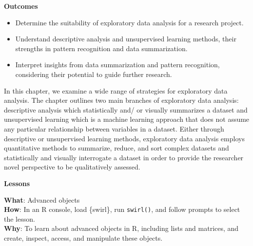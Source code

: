 \documentclass[
  letterpaper,
]{book}
\providecommand{\tightlist}{%
  \setlength{\itemsep}{0pt}\setlength{\parskip}{0pt}}\usepackage{longtable,booktabs,array}
\theoremstyle{definition}
\theoremstyle{remark}
\begin{document}
\begin{tcolorbox}[enhanced jigsaw, breakable, colframe=quarto-callout-color-frame, toprule=.15mm, arc=.35mm, colback=white, left=2mm, bottomrule=.15mm, rightrule=.15mm, opacityback=0, leftrule=.75mm]

\textbf{ Outcomes}

\begin{itemize}
\tightlist
\item
  Determine the suitability of exploratory data analysis for a research
  project.
\item
  Understand descriptive analysis and unsupervised learning methods,
  their strengths in pattern recognition and data summarization.
\item
  Interpret insights from data summarization and pattern recognition,
  considering their potential to guide further research.
\end{itemize}

\end{tcolorbox}

In this chapter, we examine a wide range of strategies for exploratory
data analysis. The chapter outlines two main branches of exploratory
data analysis: descriptive analysis which statistically and/ or visually
summarizes a dataset and unsupervised learning which is a machine
learning approach that does not assume any particular relationship
between variables in a dataset. Either through descriptive or
unsupervised learning methods, exploratory data analysis employs
quantitative methods to summarize, reduce, and sort complex datasets and
statistically and visually interrogate a dataset in order to provide the
researcher novel perspective to be qualitatively assessed.

\begin{tcolorbox}[enhanced jigsaw, breakable, colframe=quarto-callout-color-frame, toprule=.15mm, arc=.35mm, colback=white, left=2mm, bottomrule=.15mm, rightrule=.15mm, opacityback=0, leftrule=.75mm]

\textbf{ Lessons}

\textbf{What}: Advanced objects\\
\textbf{How}: In an R console, load \{swirl\}, run \texttt{swirl()}, and
follow prompts to select the lesson.\\
\textbf{Why}: To learn about advanced objects in R, including lists and
matrices, and create, inspect, access, and manipulate these objects.

\end{tcolorbox}
\end{document}
